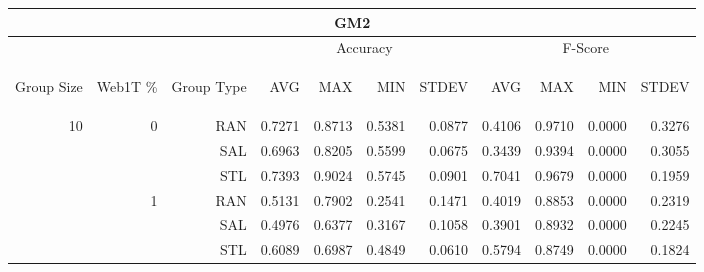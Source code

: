 \begin{center}
\begin{table}[htbp] 
 \begin{center}
\begin{tabular}{ | r | r | r | r | r | r | r | r | r | r | r |}
\hline
\multicolumn{11}{|c|}{GM2}\\
\hline
 & & & \multicolumn{4}{|c|}{Accuracy} & \multicolumn{4}{|c|}{F-Score}\\ \cline{4-11}
\begin{sideways}Group Size\end{sideways} & \begin{sideways}Web1T \%\end{sideways} & \begin{sideways}Group Type\end{sideways} & \begin{sideways}AVG\end{sideways} & \begin{sideways}MAX\end{sideways} & \begin{sideways}MIN\end{sideways} & \begin{sideways}STDEV\end{sideways} & \begin{sideways}AVG\end{sideways} & \begin{sideways}MAX\end{sideways} & \begin{sideways}MIN\end{sideways} & \begin{sideways}STDEV\end{sideways}\\
\hline
\multirow{18}{*}{10}
 & \multirow{3}{*}{0} & RAN & 0.7271 & 0.8713 & 0.5381 & 0.0877 & 0.4106 & 0.9710 & 0.0000 & 0.3276\\ \cline{3-11}
 &   & SAL & 0.6963 & 0.8205 & 0.5599 & 0.0675 & 0.3439 & 0.9394 & 0.0000 & 0.3055\\ \cline{3-11}
 &   & STL & 0.7393 & 0.9024 & 0.5745 & 0.0901 & 0.7041 & 0.9679 & 0.0000 & 0.1959\\ \cline{2-11}
 & \multirow{3}{*}{1} & RAN & 0.5131 & 0.7902 & 0.2541 & 0.1471 & 0.4019 & 0.8853 & 0.0000 & 0.2319\\ \cline{3-11}
 &   & SAL & 0.4976 & 0.6377 & 0.3167 & 0.1058 & 0.3901 & 0.8932 & 0.0000 & 0.2245\\ \cline{3-11}
 &   & STL & 0.6089 & 0.6987 & 0.4849 & 0.0610 & 0.5794 & 0.8749 & 0.0000 & 0.1824\\ \cline{2-11}

\end{tabular}
\end{center}
\end{table}
\end{center}

